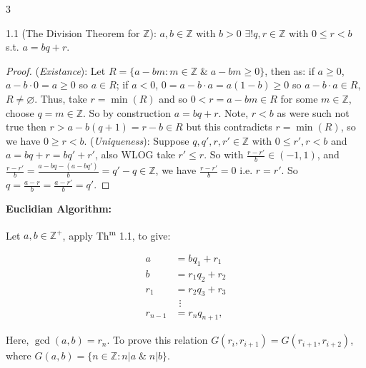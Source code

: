 \documentclass[8pt]{extarticle}
\begin{document}
    \begin{multicols}{3}
        
        \begin{theorem}{1.1}
            (The Division Theorem for \(\mathbb{Z}\)): \(a,b\in\mathbb{Z}\) with \(b>0\) \(\exists ! q,r\in\mathbb{Z}\) with \(0\le r<b\) s.t. \(a=bq+r\).
        \end{theorem}

        \begin{proof}
            (\textit{Existance}):
            Let \(R=\{a-bm:m\in\mathbb{Z} \;\&\; a-bm\ge0\}\),
            then as:
            if \(a\ge0\), \(a-b\cdot 0=a\ge0\) so \(a\in R\);
            if \(a<0\), \(0=a-b\cdot a=a(1-b)\ge0\) so \(a-b\cdot a\in R\),
            \(R\ne\varnothing\).
            Thus, take \(r=\min(R)\) and so \(0<r=a-bm\in R\) for some \(m\in\mathbb{Z}\),
            choose \(q=m\in\mathbb{Z}\).
            So by construction \(a=bq+r\).
            Note, \(r<b\) as were such not true then \(r>a-b(q+1)=r-b\in R\) but this contradicts \(r=\min(R)\), so we have \(0\ge r<b\).
            (\textit{Uniqueness}):
            Suppose \(q,q',r,r'\in\mathbb{Z}\) with \(0\le r',r<b\) and \(a=bq+r=bq'+r'\),
            also WLOG take \(r'\le r\).
            So with \(\frac{r-r'}b\in(-1,1)\), and \(\frac{r-r'}b=\frac{a-bq-(a-bq')}b=q'-q\in\mathbb{Z}\),
            we have \(\frac{r-r'}b=0\) i.e. \(r=r'\).
            So \(q=\frac{a-r}b=\frac{a-r'}b=q'\).
        \end{proof}

        \textbf{Euclidian Algorithm:}

        Let \(a,b\in\mathbb{Z}^+\), apply Th\textsuperscript{m} 1.1, to give:

        \vspace{-15pt}
        \begin{align*}
            a&=bq_1+r_1\\
            b&=r_1q_2+r_2\\
            r_1&=r_2q_3+r_3\\
            &\hspace{5pt}\vdots\\
            r_{n-1}&=r_nq_{n+1}\text{,}
        \end{align*}
        \vspace{-15pt}

        Here, \(\gcd(a,b)=r_n\).
        To prove this relation \(G(r_{i},r_{i+1})=G(r_{i+1},r_{i+2})\), where \(G(a,b)=\{n\in\mathbb{Z}:n|a\;\&\;n|b\}\).


\end{multicols}
\end{document}
